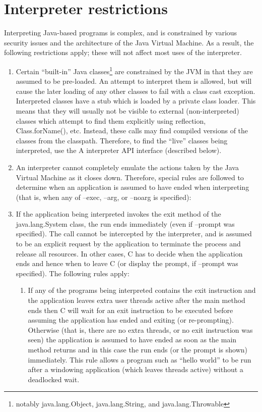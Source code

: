 \section{Interpreter restrictions} 
Interpreting Java-based programs is complex, and is constrained by various security issues and the architecture of the Java Virtual Machine. As a result, the following restrictions apply; these will not affect most uses of the interpreter. 
\begin{enumerate}
\item Certain “built-in” Java classes\footnote{notably java.lang.Object, java.lang.String, and java.lang.Throwable} are constrained by the JVM in that they are assumed to be pre-loaded. An attempt to interpret them is allowed, but will cause the later loading of any other classes to fail with a class cast exception. 
Interpreted classes have a stub which is loaded by a private class loader. This means that they will usually not be visible to external (non-interpreted) classes which attempt to find them explicitly using reflection, Class.forName(), etc. Instead, these calls may find compiled versions of the classes from the classpath. Therefore, to find the “live” classes being interpreted, use the \nr{}A interpreter API interface (described below). 
\item An interpreter cannot completely emulate the actions taken by the Java Virtual Machine as it closes down. Therefore, special rules are followed to determine when an application is assumed to have ended when interpreting (that is, when any of –exec, –arg, or –noarg is specified): 
\item If the application being interpreted invokes the exit method of the java.lang.System class, the run ends immediately (even if –prompt was specified). The call cannot be intercepted by the interpreter, and is assumed to be an explicit request by the application to terminate the process and release all resources. 
In other cases, \nr{}C has to decide when the application ends and hence when to leave \nr{}C (or display the prompt, if –prompt was specified). The following rules apply:
\begin{enumerate} 
\item If any of the programs being interpreted contains the \nr{} exit instruction and the application leaves extra user threads active after the main method ends then \nr{}C will wait for an exit instruction to be executed before assuming the application has ended and exiting (or re-prompting). 
Otherwise (that is, there are no extra threads, or no exit instruction was seen) the application is assumed to have ended as soon as the main method returns and in this case the run ends (or the prompt is shown) immediately. This rule allows a program such as “hello world” to be run after a windowing application (which leaves threads active) without a deadlocked wait. 

\end{enumerate}
\end{enumerate}
